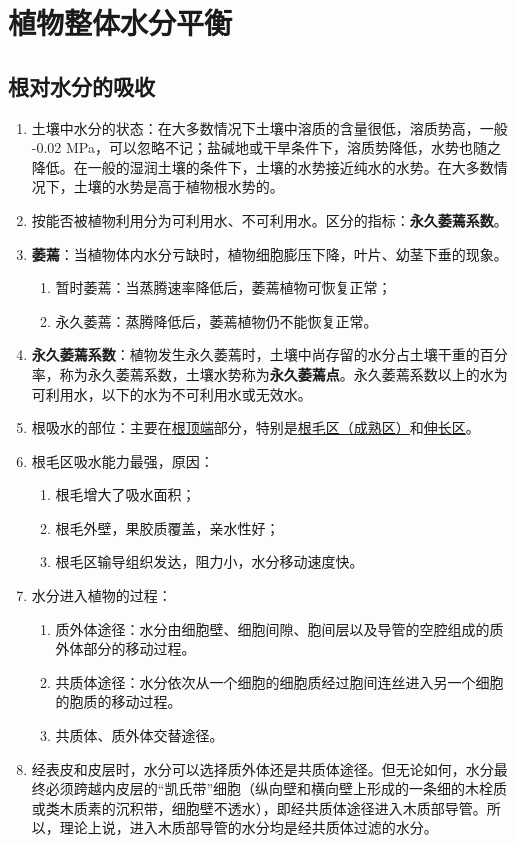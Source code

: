 \section{植物整体水分平衡}
\subsection{根对水分的吸收}
\begin{enumerate}
    \item 土壤中水分的状态：在大多数情况下土壤中溶质的含量很低，溶质势高，一般 -0.02 MPa，可以忽略不记；盐碱地或干旱条件下，溶质势降低，水势也随之降低。在一般的湿润土壤的条件下，土壤的水势接近纯水的水势。在大多数情况下，土壤的水势是高于植物根水势的。
    \item 按能否被植物利用分为可利用水、不可利用水。区分的指标：\textbf{永久萎蔫系数}。
    \item \textbf{萎蔫}：当植物体内水分亏缺时，植物细胞膨压下降，叶片、幼茎下垂的现象。
    \begin{enumerate}
        \item 暂时萎蔫：当蒸腾速率降低后，萎蔫植物可恢复正常；
        \item 永久萎蔫：蒸腾降低后，萎蔫植物仍不能恢复正常。
    \end{enumerate}
    \item \textbf{永久萎蔫系数}：植物发生永久萎蔫时，土壤中尚存留的水分占土壤干重的百分率，称为永久萎蔫系数，土壤水势称为\textbf{永久萎蔫点}。永久萎蔫系数以上的水为可利用水，以下的水为不可利用水或无效水。
    \item 根吸水的部位：主要在\uline{根顶端}部分，特别是\uline{根毛区（成熟区）}和\uline{伸长区}。
    \item 根毛区吸水能力最强，原因：
    \begin{enumerate}
        \item 根毛增大了吸水面积；
        \item 根毛外壁，果胶质覆盖，亲水性好；
        \item 根毛区输导组织发达，阻力小，水分移动速度快。  
    \end{enumerate}
    \item 水分进入植物的过程：
    \begin{enumerate}
        \item 质外体途径：水分由细胞壁、细胞间隙、胞间层以及导管的空腔组成的质外体部分的移动过程。
        \item 共质体途径：水分依次从一个细胞的细胞质经过胞间连丝进入另一个细胞的胞质的移动过程。
        \item 共质体、质外体交替途径。
    \end{enumerate}
    \item 经表皮和皮层时，水分可以选择质外体还是共质体途径。但无论如何，水分最终必须跨越内皮层的“凯氏带”细胞（纵向壁和横向壁上形成的一条细的木栓质或类木质素的沉积带，细胞壁不透水），即经共质体途径进入木质部导管。所以，理论上说，进入木质部导管的水分均是经共质体过滤的水分。
\end{enumerate}

